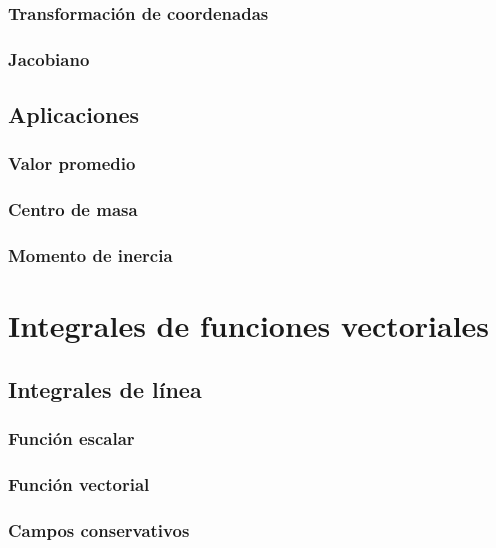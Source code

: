 \documentclass[12pt, fleqn]{report}                             %
\begin{document}
            \subsection{Transformación de coordenadas}
            
            \subsection{Jacobiano}
            
        \section{Aplicaciones}
        
            \subsection{Valor promedio}
            
            \subsection{Centro de masa}
            
            \subsection{Momento de inercia}
        
    \chapter{Integrales de funciones vectoriales}
    
        \section{Integrales de línea}
        
            \subsection{Función escalar}
            
            \subsection{Función vectorial}
            
            \subsection{Campos conservativos}
            
\end{document}
